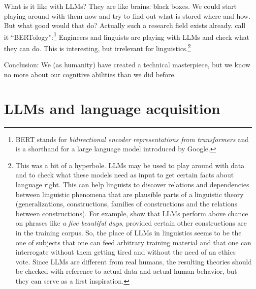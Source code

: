 What is it like with LLMs? They are like brains: black boxes. We could start playing around with
them now and try to find out what is stored where and how. But what good would that do? Actually
such a research field exists already. \citet[]{BK2020a} call it ``BERTology'':\footnote{%
  BERT stands for \emph{bidirectional encoder representations from transformers} and is a shorthand
  for a large language model introduced by Google.%
}
Engineers and linguists are playing with LLMs and check what they can do. This is interesting, but irrelevant for
linguistics.\footnote{%
  This was a bit of a hyperbole. LLMs may be used to play around with data and to check what these
  models need as input to get certain facts about language right. This can help linguists to
  discover relations and dependencies between linguistic phenomena that are plausible parts of a
  linguistic theory (generalizations, constructions, families of constructions and the relations
  between constructions). For example,
  \citet{MisraMahowald2024a} show that LLMs perform above chance on phrases like \emph{a five
    beautiful days}, provided certain other constructions are in the training corpus. So, the place of LLMs in
  linguistics seems to be the one of subjects that one can feed arbitrary training material and that
  one can interrogate without them getting tired and without the need of an ethics vote. Since LLMs
  are different from real humans, the resulting theories should be checked with reference to actual
  data and actual human behavior, but they can serve as a first inspiration.%
} 

Conclusion: We (as humanity) have created a technical masterpiece, but we know no more about our
cognitive abilities than we did before.


\section{LLMs and language acquisition}

